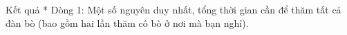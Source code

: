 Kết quả
* Dòng 1: Một số nguyên duy nhất, tổng thời gian cần để thăm tất cả đàn bò (bao gồm hai lần thăm cô bò ở nơi mà bạn nghỉ).